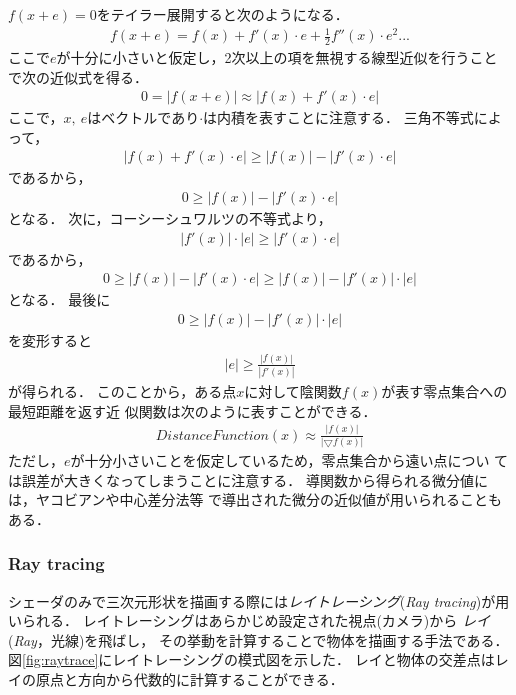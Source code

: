 $f(x + e) = 0$をテイラー展開すると次のようになる．
\begin{align*}
f(x + e) = f(x) + f'(x) \cdot e  + \frac{1}{2}f''(x) \cdot e^2 ...
\end{align*}
ここで$e$が十分に小さいと仮定し，2次以上の項を無視する線型近似を行うこと
で次の近似式を得る．
\begin{align*}
0=|f(x + e)| \approx |f(x) + f'(x) \cdot e|
\end{align*}
ここで，$x,~e$はベクトルであり$\cdot$は内積を表すことに注意する．
三角不等式によって，
\begin{align*}
| f(x) + f'(x) \cdot e| \geq |f(x)| - |f'(x) \cdot e|
\end{align*}
であるから，
\begin{align*}
0 \geq |f(x)| - |f'(x) \cdot e|
\end{align*}
となる．
次に，コーシーシュワルツの不等式より，
\begin{align*}
 |f'(x)| \cdot |e| \geq | f'(x)\cdot e|
\end{align*}
であるから，
\begin{align*}
 0 \geq |f(x)| - |f'(x) \cdot e| \geq |f(x)| - |f'(x)| \cdot |e|
\end{align*}
となる．
最後に
\begin{align*}
0 \geq |f(x)| - |f'(x)| \cdot |e|
\end{align*}
を変形すると
\begin{align*}
|e| \geq \frac{|f(x)|}{|f'(x)|}
\end{align*}
が得られる．
このことから，ある点$x$に対して陰関数$f(x)$が表す零点集合への最短距離を返す近
似関数は次のように表すことができる．
\begin{align*}
 DistanceFunction(x) \approx \frac{|f(x)|}{|\bigtriangledown f(x)|}
\end{align*}
ただし，$e$が十分小さいことを仮定しているため，零点集合から遠い点につい
ては誤差が大きくなってしまうことに注意する．
導関数から得られる微分値には，ヤコビアンや中心差分法等
で導出された微分の近似値が用いられることもある．

\subsubsection{Ray tracing}

シェーダのみで三次元形状を描画する際には\emph{レイトレーシング}({\it Ray
tracing})が用いられる．
レイトレーシングはあらかじめ設定された視点(カメラ)から
\emph{レイ}({\it Ray}，光線)を飛ばし，
その挙動を計算することで物体を描画する手法である．
図\ref{fig:raytrace}にレイトレーシングの模式図を示した．
レイと物体の交差点はレイの原点と方向から代数的に計算することができる．

